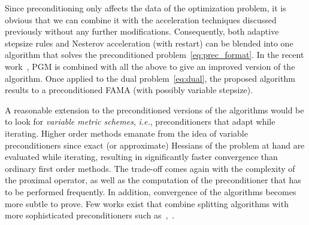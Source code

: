 \documentclass[openany]{now}
\newcommand{\ie}{{\it i.e.}}
\begin{document}
\remark Since preconditioning only affects the data of the optimization problem, it is obvious that we can combine it with the acceleration techniques discussed previously without any further modifications. Consequently, both adaptive stepsize rules and Nesterov acceleration (with restart) can be blended into one algorithm that solves the preconditioned problem~\eqref{eq:prec_format}. In the recent work~\cite{fasta}, PGM is combined with all the above to give an improved version of the algorithm. Once applied to the dual problem~\eqref{eq:dual}, the proposed algorithm results to a preconditioned FAMA (with possibly variable stepsize).

\remark A reasonable extension to the preconditioned versions of the algorithms would be to look for \emph{variable metric schemes}, \ie, preconditioners that adapt while iterating. Higher order methods emanate from the idea of variable preconditioners since exact (or approximate) Hessians of the problem at hand are evaluated while iterating, resulting in significantly faster convergence than ordinary first order methods. The trade-off comes again with the complexity of the proximal operator, as well as the computation of the preconditioner that has to be performed frequently. In addition, convergence of the algorithms becomes more subtle to prove. Few works exist that combine splitting algorithms with more sophisticated preconditioners such as~\cite{quasi_newton},~\cite{combettes2014variable}.
\end{document}
